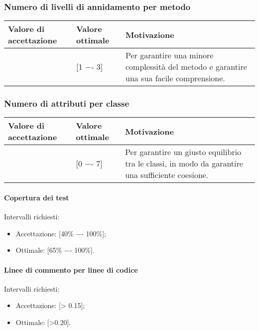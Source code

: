 \subsubsection{Numero di livelli di annidamento per metodo}

\begin{center}
		\begin{tabular}{|P{2.5cm}|P{2.5cm}|P{6cm}|}
		\hline
			\textbf{Valore di accettazione}	& \textbf{Valore ottimale} & \textbf{Motivazione} \\
			\hline
			[1 -- 5] & [1 −- 3] &	Per garantire una minore complessità del metodo e garantire una sua facile comprensione. \\
			\hline
			\end{tabular}
\end{center}

\subsubsection{Numero di attributi per classe}

\begin{center}
		\begin{tabular}{|P{2.5cm}|P{2.5cm}|P{6cm}|}
		\hline
			\textbf{Valore di accettazione}	& \textbf{Valore ottimale} & \textbf{Motivazione} \\
			\hline
			[0 −- 11] & [0 −- 7] &	Per garantire un giusto equilibrio tra le classi, in modo da garantire una sufficiente coesione. \\
			\hline
			\end{tabular}
\end{center}

\paragraph{Copertura dei test}
Intervalli richiesti:
\begin{itemize}
\item
Accettazione: [40\% −- 100\%];
\item
Ottimale: [65\% −- 100\%].
\end{itemize}

\paragraph{Linee di commento per linee di codice}
Intervalli richiesti:
\begin{itemize}
\item
Accettazione: [> 0.15];
\item
Ottimale: [>0.20].
\end{itemize}

